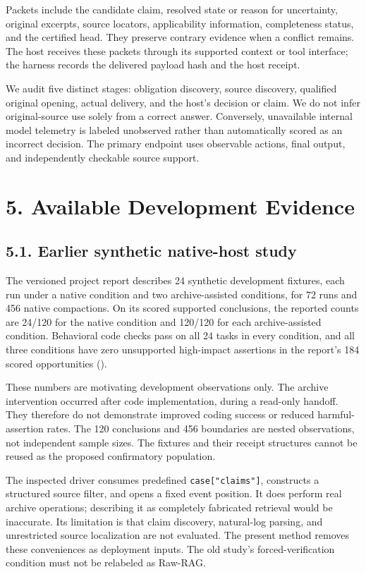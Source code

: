 \documentclass[
  11pt,
  a4paper,
]{article}
\begin{document}
Packets include the candidate claim, resolved state or reason for
uncertainty, original excerpts, source locators, applicability
information, completeness status, and the certified head. They preserve
contrary evidence when a conflict remains. The host receives these
packets through its supported context or tool interface; the harness
records the delivered payload hash and the host receipt.

We audit five distinct stages: obligation discovery, source discovery,
qualified original opening, actual delivery, and the host's decision or
claim. We do not infer original-source use solely from a correct answer.
Conversely, unavailable internal model telemetry is labeled unobserved
rather than automatically scored as an incorrect decision. The primary
endpoint uses observable actions, final output, and independently
checkable source support.

\section{5. Available Development
Evidence}\label{available-development-evidence}

\subsection{5.1. Earlier synthetic native-host
study}\label{earlier-synthetic-native-host-study}

The versioned project report describes 24 synthetic development
fixtures, each run under a native condition and two archive-assisted
conditions, for 72 runs and 456 native compactions. On its scored
supported conclusions, the reported counts are 24/120 for the native
condition and 120/120 for each archive-assisted condition. Behavioral
code checks pass on all 24 tasks in every condition, and all three
conditions have zero unsupported high-impact assertions in the report's
184 scored opportunities ().

These numbers are motivating development observations only. The archive
intervention occurred after code implementation, during a read-only
handoff. They therefore do not demonstrate improved coding success or
reduced harmful-assertion rates. The 120 conclusions and 456 boundaries
are nested observations, not independent sample sizes. The fixtures and
their receipt structures cannot be reused as the proposed confirmatory
population.

The inspected driver consumes predefined \texttt{case{[}"claims"{]}},
constructs a structured source filter, and opens a fixed event position.
It does perform real archive operations; describing it as completely
fabricated retrieval would be inaccurate. Its limitation is that claim
discovery, natural-log parsing, and unrestricted source localization are
not evaluated. The present method removes these conveniences as
deployment inputs. The old study's forced-verification condition must
not be relabeled as Raw-RAG.
\end{document}
